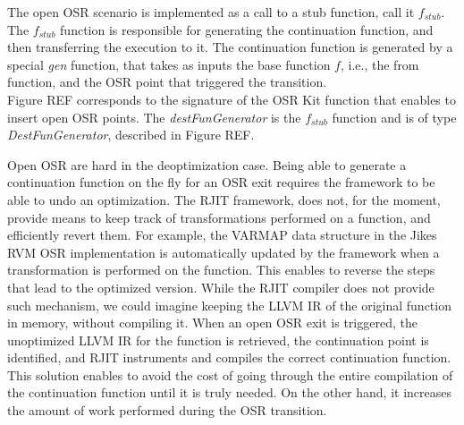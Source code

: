 The open OSR scenario is implemented as a call to a stub function, call it $f_{stub}$.
The $f_{stub}$ function is responsible for generating the continuation function, and then transferring the execution to it.
The continuation function is generated by a special \textit{gen} function, that takes as inputs the base function $f$, i.e., the from function, and the OSR point that triggered the transition.\\

Figure REF corresponds to the signature of the OSR Kit function that enables to insert open OSR points.
The \textit{destFunGenerator} is the $f_{stub}$ function and is of type \textit{DestFunGenerator}, described in Figure REF.\\

\begin{minipage}{\linewidth}
\end{minipage}

\begin{minipage}{\linewidth}
\end{minipage}

Open OSR are hard in the deoptimization case.
Being able to generate a continuation function on the fly for an OSR exit requires the framework to be able to undo an optimization.
The RJIT framework, does not, for the moment, provide means to keep track of transformations performed on a function, and efficiently revert them.
For example, the VARMAP data structure in the Jikes RVM OSR implementation\cite{soman2006efficient} is automatically updated by the framework when a transformation is performed on the function.
This enables to reverse the steps that lead to the optimized version.
While the RJIT compiler does not provide such mechanism, we could imagine keeping the LLVM IR of the original function in memory, without compiling it.
When an open OSR exit is triggered, the unoptimized LLVM IR for the function is retrieved, the continuation point is identified, and RJIT instruments and compiles the correct continuation function.
This solution enables to avoid the cost of going through the entire compilation of the continuation function until it is truly needed.
On the other hand, it increases the amount of work performed during the OSR transition.\\

